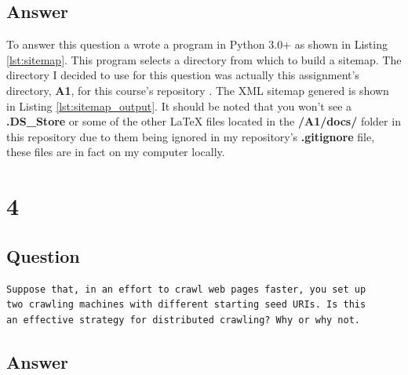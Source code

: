 \documentclass[letterpaper,11pt]{article}
\newcommand*{\srcPath}{../src}%
\begin{document}
\subsection*{Answer}

To answer this question a wrote a program in Python 3.0+ as shown in Listing \ref{lst:sitemap}. 
This program selects a directory from which to build a sitemap.
The directory I decided to use for this question was actually this assignment's directory, \textbf{A1}, for this course's repository \cite{github}.
The XML sitemap genered is shown in Listing \ref{lst:sitemap_output}. 
It should be noted that you won't see a \textbf{.DS\_Store} or some of the other LaTeX files located in the \textbf{/A1/docs/} folder in this 
repository due to them being ignored in my repository's \textbf{.gitignore} file, these files are in fact on my computer locally. 


 

 

\clearpage


\section*{4}

\subsection*{Question}

\begin{verbatim}
Suppose that, in an effort to crawl web pages faster, you set up 
two crawling machines with different starting seed URIs. Is this 
an effective strategy for distributed crawling? Why or why not.
\end{verbatim}

\subsection*{Answer}
\end{document}

